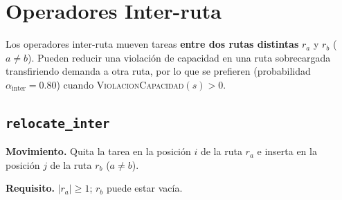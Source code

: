 \documentclass[12pt, a4paper]{article}
\begin{document}
\section{Operadores Inter-ruta}
\label{sec:inter}

Los operadores inter-ruta mueven tareas \textbf{entre dos rutas distintas}
$r_a$ y $r_b$ ($a \neq b$).  Pueden reducir una violación de capacidad en
una ruta sobrecargada transfiriendo demanda a otra ruta, por lo que se
prefieren (probabilidad $\alpha_{\mathrm{inter}} = 0.80$) cuando
\textsc{ViolacionCapacidad}$(s) > 0$.

\subsection{\texttt{relocate\_inter}}

\textbf{Movimiento.} Quita la tarea en la posición $i$ de la ruta $r_a$ e
inserta en la posición $j$ de la ruta $r_b$ ($a \neq b$).

\textbf{Requisito.} $|r_a| \geq 1$; $r_b$ puede estar vacía.
\end{document}
